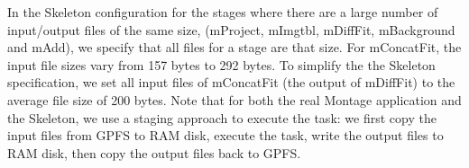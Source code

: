 \documentclass{sig-alternate}
\newcommand{\katznote}[1]{ {\textcolor{blue}    { ***Dan:      #1 }}}
\newcommand{\zhaonote}[1]{{\textcolor{darkgreen}    { ***Zhao:      #1 }}}
\newcommand{\katznote}[1]{}
\newcommand{\zhaonote}[1]{}
\begin{document}
In the Skeleton configuration for the stages where there are a large number of input/output files of the same size, (mProject, mImgtbl, mDiffFit, mBackground and mAdd), 
we specify that all files for a stage are that size. 
For mConcatFit, the 
input file sizes vary from 157 bytes to 292 bytes. To simplify the the Skeleton specification, we set all input files of mConcatFit 
(the output of mDiffFit) to the average file size of 200 bytes.
Note that for both the real Montage application and the Skeleton, we use a staging approach to execute the task: we first copy the input files
from GPFS to RAM disk, execute the task, write the output files to RAM disk, then copy the output files back to GPFS. 
\end{document}
